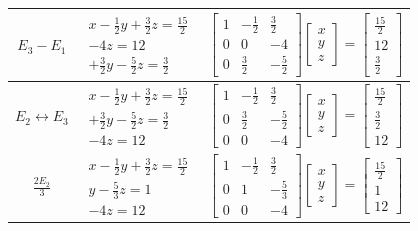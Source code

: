 \begin{center}
\begin{longtable}{|c|c|c|}
\hline
$E_3 - E_1$ & $\begin{array}{c} x -\frac{1}{2}y +\frac{3}{2}z = \frac{15}{2} \\ -4z = 12 \\ +\frac{3}{2}y -\frac{5}{2}z = \frac{3}{2} \end{array}$ & $\left[\begin{array}{ccc} 1 & -\frac{1}{2} & \frac{3}{2} \\ 0 & 0 & -4 \\ 0 & \frac{3}{2} & -\frac{5}{2} \end{array}\right] \left[ \begin{array}{c} x \\ y \\ z \end{array}\right] = \left[ \begin{array}{c} \frac{15}{2} \\ 12 \\ \frac{3}{2} \end{array}\right]$\\[20pt] 
\hline
$E_2 \leftrightarrow E_3$ & $\begin{array}{c} x -\frac{1}{2}y +\frac{3}{2}z = \frac{15}{2} \\ +\frac{3}{2}y -\frac{5}{2}z = \frac{3}{2} \\ -4z = 12  \end{array}$ & $\left[\begin{array}{ccc} 1 & -\frac{1}{2} & \frac{3}{2} \\ 0 & \frac{3}{2} & -\frac{5}{2} \\ 0 & 0 & -4 \end{array}\right] \left[ \begin{array}{c} x \\ y \\ z \end{array}\right] = \left[ \begin{array}{c} \frac{15}{2} \\ \frac{3}{2} \\ 12 \end{array}\right]$\\[20pt] 
\hline
$\frac{2E_2}{3}$ & $\begin{array}{c} x -\frac{1}{2}y +\frac{3}{2}z = \frac{15}{2} \\ y -\frac{5}{3}z = 1 \\ -4z = 12  \end{array}$ & $\left[\begin{array}{ccc} 1 & -\frac{1}{2} & \frac{3}{2} \\ 0 & 1 & -\frac{5}{3} \\ 0 & 0 & -4 \end{array}\right] \left[ \begin{array}{c} x \\ y \\ z \end{array}\right] = \left[ \begin{array}{c} \frac{15}{2} \\ 1 \\ 12 \end{array}\right]$\\[20pt] 

\end{longtable}
\end{center}
